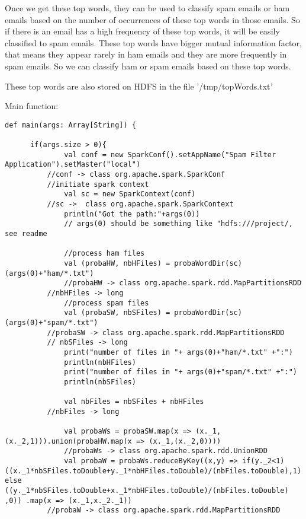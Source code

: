 \documentclass[paper=a4, fontsize=11pt]{scrartcl}
\numberwithin{equation}{section}		%
\numberwithin{figure}{section}			%
\numberwithin{table}{section}				%
\begin{document}
\begin{alphalist}
\begin{itemize}
      \end{itemize}
      Once we get these top words, they can be used to classify spam emails or ham emails based on the number of occurrences of these top words in those emails. So if  there is an email has a high frequency of these top words, it will be easily  classified to spam emails.
      These top words have bigger mutual information factor, that means they appear rarely in ham emails and they are more frequently in spam emails. So we can classify ham or spam emails based on these top words.
	\item These top words are also stored on HDFS in the file
	'/tmp/topWords.txt'
\end{alphalist}
Main function:
\begin{lstlisting}
def main(args: Array[String]) {

      if(args.size > 0){
              val conf = new SparkConf().setAppName("Spam Filter Application").setMaster("local")
	      //conf -> class org.apache.spark.SparkConf
	      //initiate spark context
              val sc = new SparkContext(conf)
	      //sc ->  class org.apache.spark.SparkContext
              println("Got the path:"+args(0))
              // args(0) should be something like "hdfs:///project/, see readme

              //process ham files
              val (probaHW, nbHFiles) = probaWordDir(sc)(args(0)+"ham/*.txt")
              //probaHW -> class org.apache.spark.rdd.MapPartitionsRDD
	      //nbHFiles -> long
              //process spam files
              val (probaSW, nbSFiles) = probaWordDir(sc)(args(0)+"spam/*.txt")
	      //probaSW -> class org.apache.spark.rdd.MapPartitionsRDD
	      // nbSFiles -> long
              print("number of files in "+ args(0)+"ham/*.txt" +":")
              println(nbHFiles)
              print("number of files in "+ args(0)+"spam/*.txt" +":")
              println(nbSFiles)

              val nbFiles = nbSFiles + nbHFiles
	      //nbFiles -> long
             
              val probaWs = probaSW.map(x => (x._1,(x._2,1))).union(probaHW.map(x => (x._1,(x._2,0))))
              //probaWs -> class org.apache.spark.rdd.UnionRDD
              val probaW = probaWs.reduceByKey((x,y) => if(y._2<1) ((x._1*nbSFiles.toDouble+y._1*nbHFiles.toDouble)/(nbFiles.toDouble),1) else ((y._1*nbSFiles.toDouble+x._1*nbHFiles.toDouble)/(nbFiles.toDouble) ,0)) .map(x => (x._1,x._2._1))
 	      //probaW -> class org.apache.spark.rdd.MapPartitionsRDD




\end{lstlisting}
\end{document}
